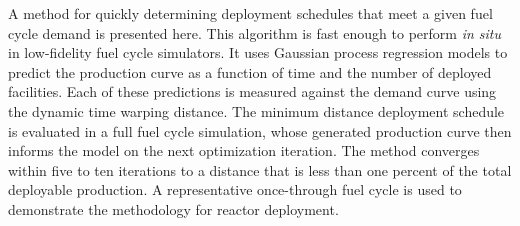 A method for quickly determining deployment schedules that meet a given 
fuel cycle demand is presented here. This algorithm is fast enough to 
perform \emph{in situ} in low-fidelity fuel cycle simulators. It uses
Gaussian process regression models to predict the production curve as a 
function of time and the number of deployed facilities. Each of these
predictions is measured against the demand curve using the dynamic time
warping distance. The minimum distance deployment schedule is evaluated
in a full fuel cycle simulation, whose generated production curve 
then informs the model on the next optimization iteration. The method
converges within five to ten iterations to a distance that is less than one 
percent of the total deployable production. A representative once-through
fuel cycle is used to demonstrate the methodology for reactor deployment.
